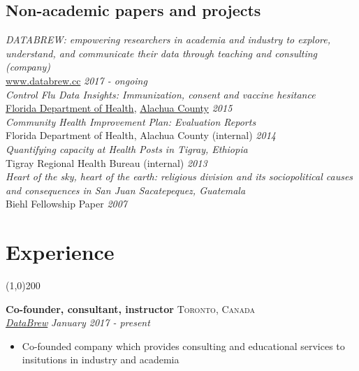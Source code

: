 \documentclass[11pt]{article}
\begin{document}
\subsection*{Non-academic papers and projects}

\noindent \emph{DATABREW: empowering researchers in academia and industry to explore, understand,
and communicate their data through teaching and consulting (company)}\\
\href{www.databrew.cc}{www.databrew.cc} \hfill \emph{2017 - ongoing}\\


\noindent \emph{Control Flu Data Insights: Immunization, consent and vaccine hesitance}\\ \href{http://economicsofmalaria.com/pdfs/estimating.pdf}{Florida Department of Health}, \href{http://economicsofmalaria.com/pdfs/targeting.pdf}{Alachua County} \hfill \emph{2015}\\

\noindent \emph{Community Health Improvement Plan: Evaluation Reports} \\ Florida Department of Health, Alachua County (internal) \hfill \emph{2014}\\

\noindent \emph{Quantifying capacity at Health Posts in Tigray, Ethiopia} \\ Tigray Regional Health Bureau (internal) \hfill \emph{2013}\\


\noindent \emph{Heart of the sky, heart of the earth: religious division and its sociopolitical causes and consequences in San Juan Sacatepequez, Guatemala} \\ Biehl Fellowship Paper \hfill \emph{2007}\\

\newpage

\section*{Experience} %
\vspace{-7mm}
\line(1,0){200}
\vspace{2mm}

\noindent \textbf{Co-founder, consultant, instructor} \hfill \textsc{Toronto, Canada}\\
\noindent \emph{\href{www.databrew.cc}{DataBrew}} \hfill \emph{January 2017 - present}
\vspace{-2mm}
\begin{itemize}\itemsep0pt \parskip0pt 
\item Co-founded company which provides consulting and educational services to insitutions in industry and academia
\end{itemize}
\end{document}
